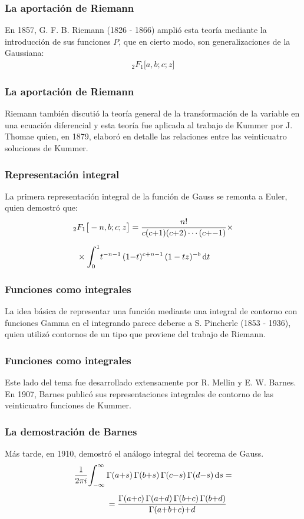 \documentclass[12pt]{beamer}
\begin{document}
\begin{frame}
\frametitle{La aportación de Riemann}
En 1857, G. F. B. Riemann (1826 - 1866) amplió esta teoría mediante la introducción de sus funciones $P$, que en cierto modo, son generalizaciones de la Gaussiana:
\pause
\begin{align*}
{}_{2} F_{1} \big[ a, b; c; z \big]
\end{align*}    
\end{frame}
\begin{frame}
\frametitle{La aportación de Riemann}
Riemann también discutió la teoría general de la transformación de la variable en una ecuación diferencial y esta teoría fue aplicada al trabajo de Kummer por J. Thomae quien, en 1879, elaboró en detalle las relaciones entre las veinticuatro soluciones de Kummer.
\end{frame}
\begin{frame}
\frametitle{Representación integral}
La primera representación integral de la función de Gauss se remonta a Euler, quien demostró que:
\pause
\begin{align}
\begin{aligned}[b]
{}_{2} &F_{1} \big[ -n, b; c; z \big] = \dfrac{n!}{c (c {+} 1)(c {+} 2) \cdots (c {+} {-} 1)} \times \\[0.5em]
&\times \scaleint{6ex}_{\bs 0}^{1} t^{-n-1} \, (1 {-} t)^{c+n-1} \, (1 - t z)^{-b} \dd{t}
\end{aligned}
\label{eq:ecuacion_01_01_07}
\end{align}
\end{frame}
\begin{frame}
\frametitle{Funciones como integrales}
La idea básica de representar una función mediante una integral de contorno con funciones Gamma en el integrando parece deberse a S. Pincherle (1853 - 1936), quien utilizó contornos de un tipo que proviene del trabajo de Riemann. 
\end{frame}
\begin{frame}
\frametitle{Funciones como integrales}
Este lado del tema fue desarrollado extensamente por R. Mellin y E. W. Barnes.
\\
\bigskip
\pause
En 1907, Barnes publicó sus representaciones integrales de contorno de las veinticuatro funciones de Kummer.
\end{frame}
\begin{frame}
\frametitle{La demostración de Barnes}
Más tarde, en 1910, demostró el análogo integral del teorema de Gauss.
\begin{align}
\begin{aligned}[b]
\dfrac{1}{2 \pi i} \scaleint{6ex}_{\bs -\infty}^{\infty} \, &\Gamma (a {+} s) \, \Gamma (b {+} s) \, \Gamma(c {-} s) \, \Gamma (d {-} s) \dd{s} = \\[0.5em]
&= \dfrac{\Gamma (a {+} c) \, \Gamma (a {+} d) \, \Gamma(b {+} c) \, \Gamma (b {+} d)}{\Gamma (a {+} b {+} c) {+ d}}
\end{aligned}
\label{eq:ecuacion_01_01_08}
\end{align}
\end{frame}
\end{document}

